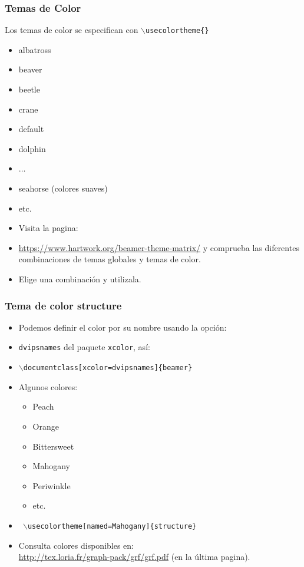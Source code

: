 \documentclass[aspectratio=43]{beamer}%
\begin{document}
\begin{frame}[fragile]
\frametitle{\textbf{Temas de Color}}
\justifying
 Los temas de color se especifican con \texttt{$\backslash$usecolortheme\{\}}
 
 \begin{itemize}\justifying
  \item albatross
  \item beaver
  \item beetle
  \item crane
  \item default
  \item dolphin
  \item$\dots$
  \item seahorse (colores suaves)
  \item etc.
\end{itemize}
\begin{block}{}
\begin{itemize}\justifying
  \item Visita la pagina:
  \item []\url{https://www.hartwork.org/beamer-theme-matrix/} y comprueba las diferentes combinaciones de temas globales y temas de color.
  \item Elige una combinación y utilizala.
\end{itemize}

\end{block}

\end{frame}

\begin{frame}[fragile]
\frametitle{\textbf{Tema de color structure}}
\justifying
 \begin{itemize}\justifying
  \item Podemos definir el color por su nombre usando la opción:
  \item [] \texttt{dvipsnames} del paquete \texttt{xcolor}, así:
  \item [] \texttt{$\backslash$documentclass[xcolor=dvipsnames]\{beamer\}}
  \item Algunos colores:
  \begin{itemize}\justifying
  \item Peach
  \item Orange
  \item Bittersweet
  \item Mahogany
  \item Periwinkle
  \item etc.
\end{itemize}
\item[] \texttt{
$\backslash$usecolortheme[named=Mahogany]\{structure\}}
\item Consulta colores disponibles en:\\
\url{http://tex.loria.fr/graph-pack/grf/grf.pdf} (en la última pagina).
\end{itemize}

\end{frame}
\end{document}
